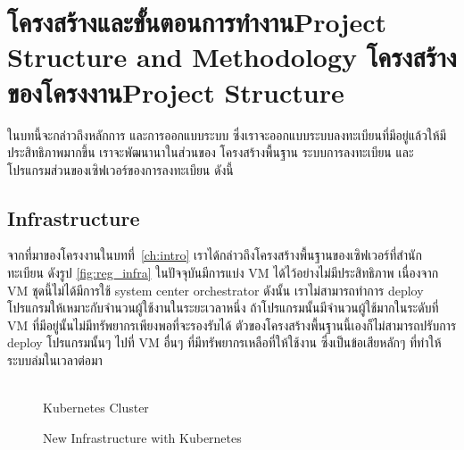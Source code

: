 \chapter{\ifproject%
\ifcpe โครงสร้างและขั้นตอนการทำงาน\else Project Structure and Methodology\fi
\else%
\ifcpe โครงสร้างของโครงงาน\else Project Structure\fi
\fi
}
\label{ch:approach}

ในบทนี้จะกล่าวถึงหลักการ และการออกแบบระบบ ซึ่งเราจะออกแบบระบบลงทะเบียนที่มีอยู่แล้วให้มีประสิทธิภาพมากขึ้น เราจะพัฒนานาในส่วนของ โครงสร้างพื้นฐาน ระบบการลงทะเบียน และโปรแกรมส่วนของเซิฟเวอร์ของการลงทะเบียน ดังนี้


\section {Infrastructure}
\label{sec:infra}

จากที่มาของโครงงานในบทที่~\ref{ch:intro} เราได้กล่าวถึงโครงสร้างพื้นฐานของเซิฟเวอร์ที่สำนักทะเบียน ดังรูป \ref{fig:reg_infra} ในปัจจุบันมีการแบ่ง VM \cite{vm} ได้ไว้อย่างไม่มีประสิทธิภาพ เนื่องจาก VM ชุดนี้ไม่ได้มีการใช้ system center orchestrator \cite{sco} ดังนั้น เราไม่สามารถทำการ deploy โปรแกรมให้เหมาะกับจำนวนผู้ใช้งานในระยะเวลาหนึ่ง ถ้าโปรแกรมนั้นมีจำนวนผู้ใช้มากในระดับที่ VM ที่มีอยู่นั้นไม่มีทรัพยากรเพียงพอที่จะรองรับได้ ตัวของโครงสร้างพื้นฐานนี้เองก็ไม่สามารถปรับการ deploy โปรแกรมนั้นๆ ไปที่ VM อื่นๆ ที่มีทรัพยากรเหลือที่ให้ใช้งาน ซึ่งเป็นข้อเสียหลักๆ ที่ทำให้ระบบล่มในเวลาต่อมา

\begin{figure}
    \centering
    \begin{center}
     \\
    Kubernetes Cluster
    \end{center}
    \caption{New Infrastructure with Kubernetes}
    \label{fig:new_infra}
\end{figure}

